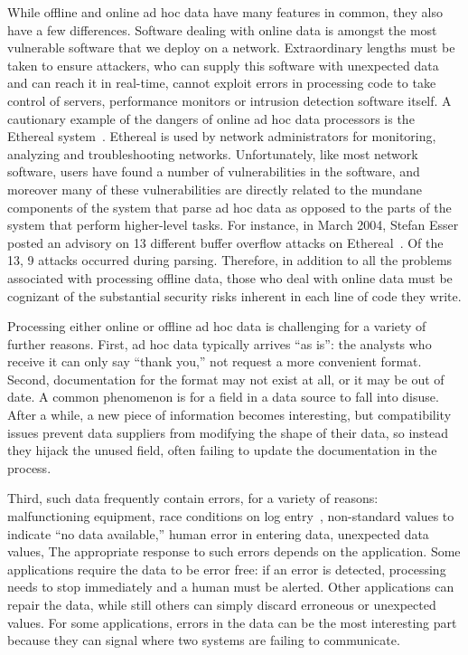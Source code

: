 \documentclass[11pt]{article}
\begin{document}
While offline and online ad hoc data have many features in common,
they also have a few differences.  Software dealing with online data
is amongst the most vulnerable software that we deploy on a network.
Extraordinary lengths must be taken to ensure attackers, who can
supply this software with unexpected data and can reach it in
real-time, cannot exploit errors in processing code to take control of
servers, performance monitors or intrusion detection software itself.
A cautionary example of the dangers of online ad hoc data processors
is the Ethereal system~\cite{ethereal}.  Ethereal is used by network
administrators for monitoring, analyzing and troubleshooting networks.
Unfortunately, like most network software, users have found a number
of vulnerabilities in the software, and moreover many of these
vulnerabilities are directly related to the mundane components of the
system that parse ad hoc data as opposed to the parts of the system that
perform higher-level tasks.  For instance, in March 2004, Stefan Esser
posted an advisory on 13 different buffer overflow attacks on
Ethereal~\cite{etherealvulnerabilities}.  Of the 13, 9 attacks
occurred during parsing.  Therefore, in addition to all the problems
associated with processing offline data, those who deal with
online data must be cognizant of the substantial security risks
inherent in each line of code they write.

Processing either online or offline ad hoc data is challenging for 
a variety of further reasons. 
First, ad hoc data typically arrives ``as is'': the analysts
who receive it can only say ``thank you,'' not request a more
convenient format.  Second, documentation for the format may not exist
at all, or it may be out of date.  A common phenomenon is for a field
in a data source to fall into disuse.  After a while, a new piece of
information becomes interesting, but compatibility issues prevent data
suppliers from modifying the shape of their data, so instead they
hijack the unused field, often failing to update the documentation in
the process.

Third, such data frequently contain errors, for a variety of reasons:
malfunctioning equipment, race conditions on log entry~\cite{wpp},
non-standard values to indicate ``no data available,'' human error in
entering data, unexpected data values, \etc{} The appropriate response
to such errors depends on the application.  Some applications require
the data to be error free: if an error is detected, processing needs
to stop immediately and a human must be alerted.  Other applications
can repair the data, while still others can simply discard erroneous
or unexpected values.  For some applications, errors in the data can
be the most interesting part because they can signal where two systems
are failing to communicate.
\end{document}
